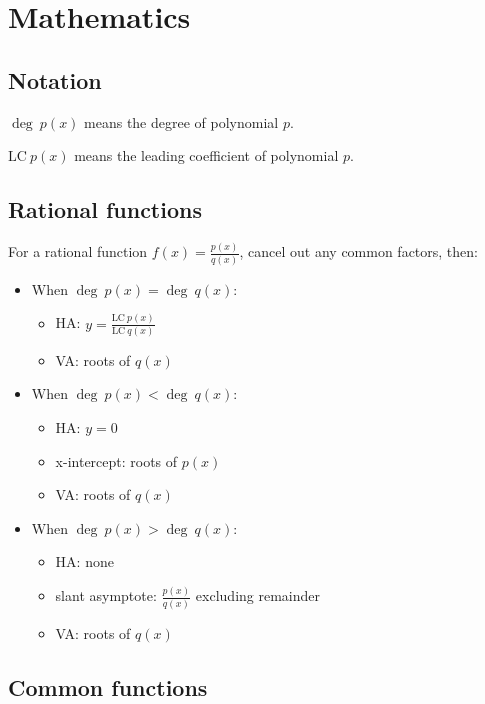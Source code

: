 
\chapter{Mathematics}

\section{Notation}

$\deg~p(x)$ means the degree of polynomial $p$.

$\text{LC}~p(x)$ means the leading coefficient of polynomial $p$.

\section{Rational functions}

For a rational function $f(x) = \frac{p(x)}{q(x)}$, cancel out any common factors, then:

\begin{itemize}
	\item When $\deg~p(x) = \deg~q(x)$:
	\begin{itemize}
		\item HA: $y = \frac{\text{LC}~p(x)}{\text{LC}~q(x)}$
		\item VA: roots of $q(x)$
	\end{itemize}
	\item When $\deg~p(x) < \deg~q(x)$:
	\begin{itemize}
		\item HA: $y = 0$
		\item x-intercept: roots of $p(x)$
		\item VA: roots of $q(x)$
	\end{itemize}
	\item When $\deg~p(x) > \deg~q(x)$:
	\begin{itemize}
		\item HA: none
		\item slant asymptote: $\frac{p(x)}{q(x)}$ excluding remainder
		\item VA: roots of $q(x)$
	\end{itemize}
\end{itemize}

\section{Common functions}

